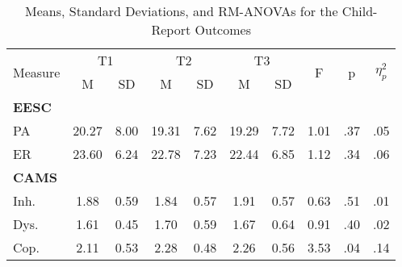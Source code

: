 \begin{table}[htbp]
\centering
\caption{Means, Standard Deviations, and RM-ANOVAs for the Child-Report Outcomes}
\label{tab:child_outcomes}
\begin{tabular}{lccccccccc}
\toprule
\multirow{2}{*}{Measure} & \multicolumn{2}{c}{T1} & \multicolumn{2}{c}{T2} & \multicolumn{2}{c}{T3} & \multirow{2}{*}{F} & \multirow{2}{*}{p} & \multirow{2}{*}{$\eta_p^2$} \\
 & M & SD & M & SD & M & SD & & & \\
\midrule
\textbf{EESC} & & & & & & & & & \\
\quad PA & 20.27 & 8.00 & 19.31 & 7.62 & 19.29 & 7.72 & 1.01 & .37 & .05 \\
\quad ER & 23.60 & 6.24 & 22.78 & 7.23 & 22.44 & 6.85 & 1.12 & .34 & .06 \\
\textbf{CAMS} & & & & & & & & & \\
\quad Inh. & 1.88 & 0.59 & 1.84 & 0.57 & 1.91 & 0.57 & 0.63 & .51 & .01 \\
\quad Dys. & 1.61 & 0.45 & 1.70 & 0.59 & 1.67 & 0.64 & 0.91 & .40 & .02 \\
\quad Cop. & 2.11 & 0.53 & 2.28 & 0.48 & 2.26 & 0.56 & 3.53 & .04 & .14 \\
\bottomrule
\end{tabular}
\end{table}

